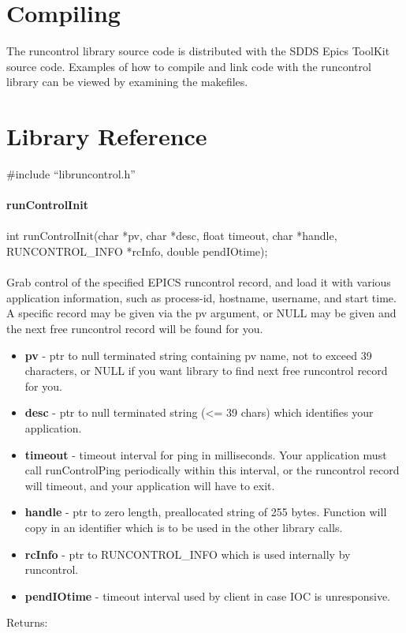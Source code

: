 \documentclass[11pt]{article}
\begin{document}
\section{Compiling}

The runcontrol library source code is distributed with the SDDS Epics ToolKit source code. Examples of how to compile and link code with the runcontrol library can be viewed by examining the makefiles.

\section{Library Reference}

\#include ``libruncontrol.h''\\
\\
{\bf runControlInit}\\
\\
int runControlInit(char *pv, char *desc, float timeout, char *handle, RUNCONTROL\_INFO *rcInfo, double pendIOtime);\\
\\
Grab control of the specified EPICS runcontrol record, and load it with various application information, such as process-id, hostname, username, and start time. A specific record may be given via the pv argument, or NULL may be given and the next free runcontrol record will be found for you.

\begin{itemize}
  \item {\bf pv} - ptr to null terminated string containing pv name, not to exceed 39 characters, or NULL if you want library to find next free runcontrol record for you.
  \item {\bf desc} - ptr to null terminated string (<= 39 chars) which identifies your application.
  \item {\bf timeout} - timeout interval for ping in milliseconds. Your application must call runControlPing periodically within this interval, or the runcontrol record will timeout, and your application will have to exit.
  \item {\bf handle} - ptr to zero length, preallocated string of 255 bytes. Function will copy in an identifier which is to be used in the other library calls.
  \item {\bf rcInfo} - ptr to RUNCONTROL\_INFO which is used internally by runcontrol.
  \item {\bf pendIOtime} - timeout interval used by client in case IOC is unresponsive.
\end{itemize}
Returns:
\end{document}

